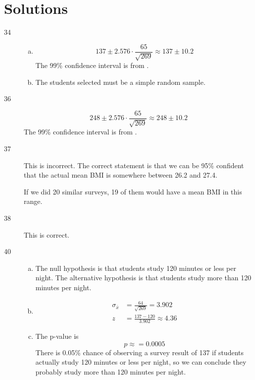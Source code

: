 \documentclass[letterpaper, landscape]{exam}
\begin{document}
    \section{Solutions}
    \begin{description}

      \item[34] 
        \begin{enumerate}[(a)]
          \item 
            \[
              137 \pm 2.576 \cdot \frac{65}{\sqrt{269}} \approx 137 \pm 10.2
            \]
            The 99\% confidence interval is from .

          \item The students selected must be a simple random sample.

        \end{enumerate}

      \item[36] 
          \[
            248 \pm 2.576 \cdot \frac{65}{\sqrt{269}} \approx 248 \pm 10.2
          \]
          The 99\% confidence interval is from .

      \item[37] This is incorrect. The correct statement is that we can be 95\%
        confident that the actual mean BMI is somewhere between 26.2 and 27.4.

        If we did 20 similar surveys, 19 of them would have a mean BMI in this
        range.

      \item[38] This is correct. 

      \item[40]
        \begin{enumerate}[(a)]
          \item The null hypothesis is that students study 120 minutes or less
            per night. The alternative hypothesis is that students study more
            than 120 minutes per night.

          \item
            \begin{align*}
              \sigma_{\bar{x}} & = \frac{64}{\sqrt{269}} = 3.902 \\
              z                & = \frac{137 - 120}{3.902} \approx 4.36
            \end{align*}

          \item The p-value is 
            \[
              p \approx = \boxed{ 0.0005 } 
            \]
            There is 0.05\% chance of observing a survey result of 137 if
            students actually study 120 minutes or less per night, so we can
            conclude they probably study more than 120 minutes per night.


\end{enumerate}
\end{description}
\end{document}
